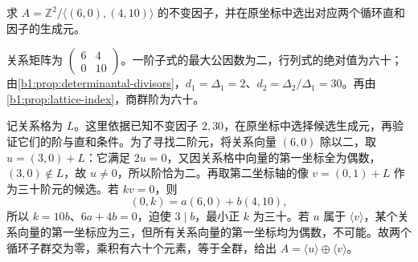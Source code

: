 \begin{exercise}\label{b1:ex:09-explicit-quotient}
	求 \(A=\mathbb Z^2/\bigl\langle(6,0),(4,10)\bigr\rangle\) 的不变因子，并在原坐标中选出对应两个循环直和因子的生成元。
\end{exercise}
\begin{solution}
	关系矩阵为 \(\begin{pmatrix}6&4\\0&10\end{pmatrix}\)。一阶子式的最大公因数为二，行列式的绝对值为六十；由\cref{b1:prop:determinantal-divisors}，\(d_1=\Delta_1=2\)、\(d_2=\Delta_2/\Delta_1=30\)。再由\cref{b1:prop:lattice-index}，商群阶为六十。

	记关系格为 \(L\)。这里依据已知不变因子 \(2,30\)，在原坐标中选择候选生成元，再验证它们的阶与直和条件。为了寻找二阶元，将关系向量 \((6,0)\) 除以二，取 \(u=(3,0)+L\)：它满足 \(2u=0\)，又因关系格中向量的第一坐标全为偶数，\((3,0)\notin L\)，故 \(u\ne0\)，所以阶恰为二。再取第二坐标轴的像 \(v=(0,1)+L\) 作为三十阶元的候选。若 \(kv=0\)，则
	\[
		(0,k)=a(6,0)+b(4,10),
	\]
	所以 \(k=10b\)、\(6a+4b=0\)，迫使 \(3\mid b\)，最小正 \(k\) 为三十。若 \(u\) 属于 \(\langle v\rangle\)，某个关系向量的第一坐标应为三，但所有关系向量的第一坐标均为偶数，不可能。故两个循环子群交为零，乘积有六十个元素，等于全群，给出 \(A=\langle u\rangle\oplus\langle v\rangle\)。
\end{solution}

